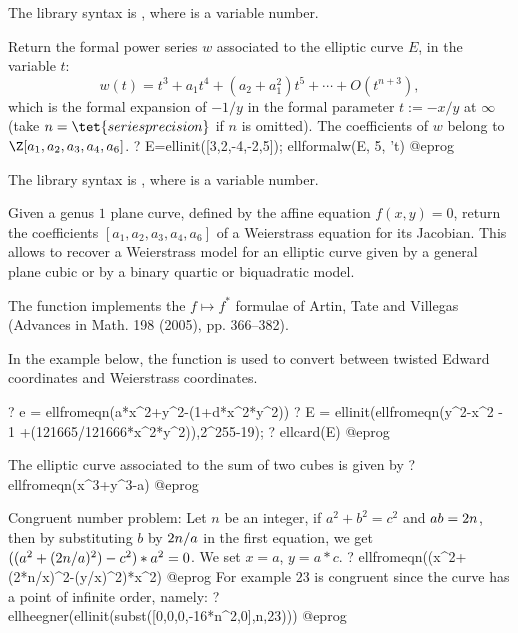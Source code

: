 The library syntax is , where  is a variable number.

\label{se:ellformalw}
Return the formal power series $w$ associated to the elliptic curve $E$,
in the variable $t$:
$$ w(t) = t^3 + a_1 t^4 + (a_2 + a_1^2) t^5 + \cdots + O(t^{n+3}),$$
which is the formal expansion of $-1/y$ in the formal parameter $t := -x/y$
at $\infty$ (take $n = \tet{seriesprecision}$ if $n$ is omitted). The
coefficients of $w$ belong to $\Z[a_1,a_2,a_3,a_4,a_6]$.
\bprog
? E=ellinit([3,2,-4,-2,5]); ellformalw(E, 5, 't)
@eprog

The library syntax is , where  is a variable number.

\label{se:ellfromeqn}
Given a genus $1$ plane curve, defined by the affine equation $f(x,y) = 0$,
return the coefficients $[a_1,a_2,a_3,a_4,a_6]$ of a Weierstrass equation
for its Jacobian. This allows to recover a Weierstrass model for an elliptic
curve given by a general plane cubic or by a binary quartic or biquadratic
model.

The function implements the $f \mapsto f^*$ formulae of Artin, Tate and
Villegas (Advances in Math. 198 (2005), pp. 366--382).

In the example below, the function is used to convert between twisted Edward
coordinates and Weierstrass coordinates.

\bprog
? e = ellfromeqn(a*x^2+y^2-(1+d*x^2*y^2))
? E = ellinit(ellfromeqn(y^2-x^2 - 1 +(121665/121666*x^2*y^2)),2^255-19);
? ellcard(E)
@eprog

The elliptic curve associated to the sum of two cubes is given by
\bprog
? ellfromeqn(x^3+y^3-a)
@eprog

Congruent number problem: Let $n$ be an integer,
if $a^2+b^2=c^2$ and $a\*b=2\*n$,
then by substituting $b$ by $2\*n/a$ in the first equation,
we get $((a^2+(2\*n/a)^2)-c^2)*a^2 = 0$.
We set $x=a$, $y=a*c$.
\bprog
? ellfromeqn((x^2+(2*n/x)^2-(y/x)^2)*x^2)
@eprog
For example $23$ is congruent since the curve has a point of infinite order,
namely:
\bprog
? ellheegner(ellinit(subst([0,0,0,-16*n^2,0],n,23)))
@eprog

